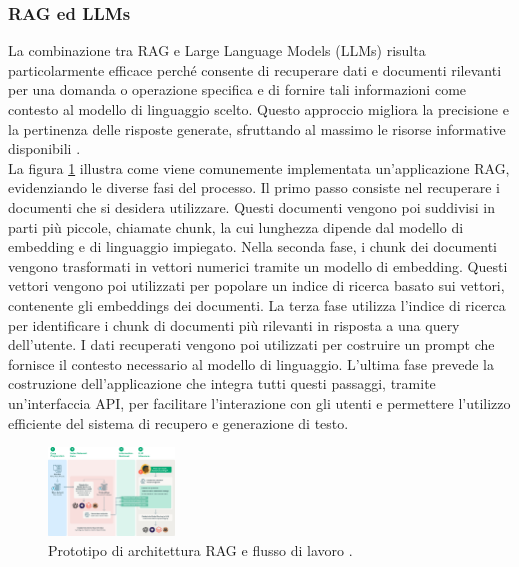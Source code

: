 \subsubsection{RAG ed LLMs}
La combinazione tra RAG e Large Language Models (LLMs) risulta particolarmente efficace perché consente di recuperare dati e documenti rilevanti per una domanda o operazione specifica e di fornire tali informazioni come contesto al modello di linguaggio scelto. Questo approccio migliora la precisione e la pertinenza delle risposte generate, sfruttando al massimo le risorse informative disponibili \cite{databricks2024rag}.\\
La figura \ref{fig:RAG-architecture} illustra come viene comunemente implementata un'applicazione RAG, evidenziando le diverse fasi del processo.
Il primo passo consiste nel recuperare i documenti che si desidera utilizzare. Questi documenti vengono poi suddivisi in parti più piccole, chiamate chunk, la cui lunghezza dipende dal modello di embedding e di linguaggio impiegato.
Nella seconda fase, i chunk dei documenti vengono trasformati in vettori numerici tramite un modello di embedding. Questi vettori vengono poi utilizzati per popolare un indice di ricerca basato sui vettori, contenente gli embeddings dei documenti. 
La terza fase utilizza l'indice di ricerca per identificare i chunk di documenti più rilevanti in risposta a una query dell'utente. I dati recuperati vengono poi utilizzati per costruire un prompt che fornisce il contesto necessario al modello di linguaggio.
L'ultima fase prevede la costruzione dell'applicazione che integra tutti questi passaggi, tramite un'interfaccia API, per facilitare l'interazione con gli utenti e permettere l'utilizzo efficiente del sistema di recupero e generazione di testo.
\begin{figure}[ht]
	\centering
	\includegraphics[width=0.3\textwidth]{Immagini/RAG_architecture.png}
	\caption{ Prototipo di architettura RAG e flusso di lavoro \cite{databricks2024rag}.}
	\label{fig:RAG-architecture}
\end{figure}